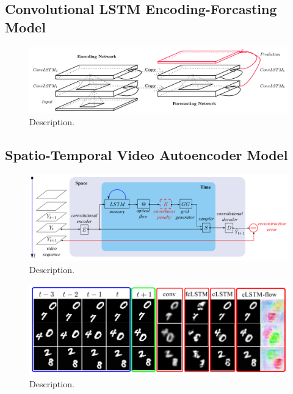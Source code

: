 \subsection{Convolutional LSTM Encoding-Forcasting Model}


\begin{figure}[htb]
	\centering
	\includegraphics[width=0.8\linewidth]{figures/related/nowcasting_model.png} 
	\caption[Short]{Description.} \label{fig:convlstm_model}
\end{figure}

\subsection{Spatio-Temporal Video Autoencoder Model}

\begin{figure}[htb]
	\centering
	\includegraphics[width=0.8\linewidth]{figures/related/spat_temp_video.png} 
	\caption[Short]{Description.} \label{fig:spatiotemp_model}
\end{figure}


\begin{figure}[htb]
	\centering
	\includegraphics[width=1.0\linewidth]{figures/related/spat_temp_results.png} 
	\caption[Short]{Description.} \label{fig:spatiotemp_results}
\end{figure}


